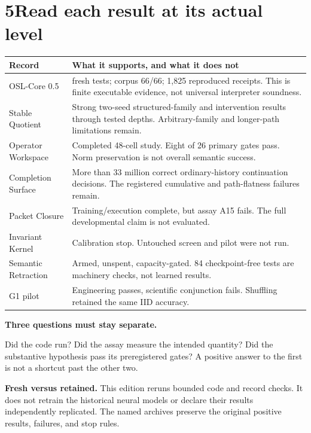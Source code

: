 \documentclass[11pt]{article}
\begin{document}
\section*{5\quad Read each result at its actual level}
\begin{center}
\begin{tabularx}{\textwidth}{>{\RaggedRight\arraybackslash}p{}>{\RaggedRight\arraybackslash}X}
\toprule Record & What it supports, and what it does not\\\midrule
OSL-Core 0.5 & 168 fresh tests; corpus 66/66; 1,825 reproduced receipts. This is finite executable evidence, not universal interpreter soundness.\\
Stable Quotient & Strong two-seed structured-family and intervention results through tested depths. Arbitrary-family and longer-path limitations remain.\\
Operator Workspace & Completed 48-cell study. Eight of 26 primary gates pass. Norm preservation is not overall semantic success.\\
Completion Surface & More than 33 million correct ordinary-history continuation decisions. The registered cumulative and path-flatness failures remain.\\
Packet Closure & Training/execution complete, but assay A15 fails. The full developmental claim is not evaluated.\\
Invariant Kernel & Calibration stop. Untouched screen and pilot were not run.\\
Semantic Retraction & Armed, unspent, capacity-gated. 84 checkpoint-free tests are machinery checks, not learned results.\\
G1 pilot & Engineering passes, scientific conjunction fails. Shuffling retained the same IID accuracy.\\\bottomrule
\end{tabularx}
\end{center}
\textbf{Three questions must stay separate.}

Did the code run? Did the assay measure the intended quantity? Did the substantive hypothesis pass its preregistered gates? A positive answer to the first is not a shortcut past the other two.

\textbf{Fresh versus retained.} This edition reruns bounded code and record checks. It does not retrain the historical neural models or declare their results independently replicated. The named archives preserve the original positive results, failures, and stop rules.
\end{document}
